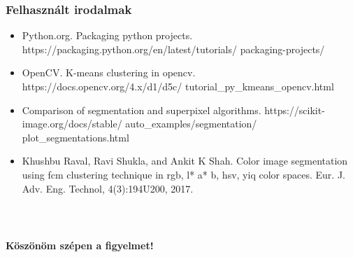 \documentclass{beamer}
\begin{document}
\begin{frame}[fragile]
\frametitle{Felhasznált irodalmak}

\begin{itemize}
	\item Python.org. Packaging python projects. https://packaging.python.org/en/latest/tutorials/
    packaging-projects/
    \item OpenCV. K-means clustering in opencv. https://docs.opencv.org/4.x/d1/d5c/
    tutorial\_py\_kmeans\_opencv.html
    \item Comparison of segmentation and superpixel algorithms. https://\mbox{scikit-image}.org/docs/stable/
    \mbox{auto\_examples}/segmentation/
    plot\_segmentations.html
    \item Khushbu Raval, Ravi Shukla, and Ankit K Shah. Color image segmentation using fcm clustering technique in rgb, l* a* b, hsv, yiq color spaces. Eur. J. Adv. Eng. Technol, 4(3):194U200, 2017.
\end{itemize}

\end{frame}

\begin{frame}[fragile]
\frametitle{\ }

\begin{center}

    \Large

    \textbf{Köszönöm szépen a figyelmet!}

    \bigskip

\end{center}

\end{frame}
\end{document}
